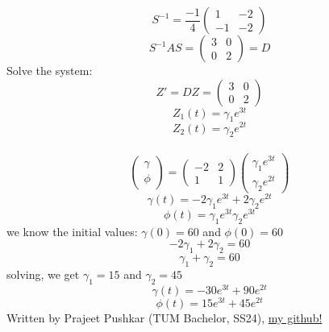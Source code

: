 \documentclass{article}
\begin{document}
\begin{equation*} S^{-1} = \frac{-1}{4}\begin{pmatrix} 1 & -2 \\ -1 & -2 \end{pmatrix}\end{equation*}
\begin{equation*} S^{-1}AS = \begin{pmatrix} 3 & 0 \\ 0 & 2 \end{pmatrix} = D \end{equation*}
Solve the system: \begin{equation*} Z' = DZ = \begin{pmatrix} 3 & 0 \\ 0 & 2 \end{pmatrix} \end{equation*}
\begin{equation*} Z_1(t) = \gamma_1 e^{3t} \end{equation*}
\begin{equation*} Z_2(t) = \gamma_2 e^{2t} \end{equation*}
\\[2mm]
\begin{equation*} \begin{pmatrix} \gamma \\[6pt] \phi  \end{pmatrix} = \begin{pmatrix} -2 & 2 \\[6pt] 1 & 1 \end{pmatrix} \begin{pmatrix} \gamma_1 e^{3t} \\[6pt] \gamma_2 e^{2t} \end{pmatrix} \end{equation*}
\begin{equation*} \gamma(t) = -2 \gamma_1 e^{3t} + 2 \gamma_2 e^{2t} \end{equation*}
\begin{equation*} \phi(t) = \gamma_1 e^{3t} \gamma_2 e^{3t} \end{equation*}
we know the initial values: $\gamma(0) = 60$ and $\phi(0) = 60$ \newline
\begin{equation*} -2\gamma_1 + 2\gamma_2 = 60\end{equation*}
\begin{equation*} \gamma_1 + \gamma_2 = 60 \end{equation*} 
solving, we get $\gamma_1 = 15$ and $\gamma_2 = 45$
\begin{equation*} \gamma(t) = -30 e^{3t} + 90 e^{2t} \end{equation*}
\begin{equation*} \phi(t) = 15 e^{3t} + 45 e^{2t} \end{equation*}
\vfill
Written by Prajeet Pushkar (TUM Bachelor, SS24), \href{https://github.com/PenguinPuff}{my github!} 
\end{document}
